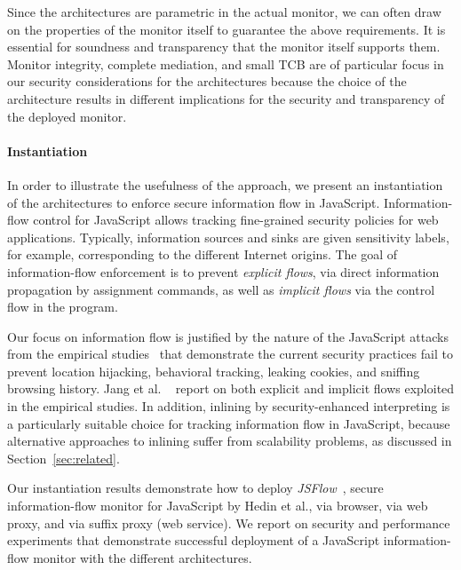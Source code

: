 \documentclass{llncs}
\begin{document}
Since the architectures are parametric in the actual monitor, we can
often draw on the properties of the monitor itself to guarantee the
above requirements. It is essential for soundness and
transparency that the monitor itself supports them. Monitor integrity,
complete mediation, and small TCB are of particular focus in our security
considerations for the architectures because the choice of the architecture results in
different implications for the security and transparency of the
deployed monitor.

\paragraph{Instantiation}
In order to illustrate the usefulness of the approach, we present an
instantiation of the architectures to enforce secure information flow
in JavaScript. Information-flow control for JavaScript allows tracking
fine-grained security policies for web applications. Typically,
information sources  and sinks are given sensitivity labels, for
example, corresponding to the different Internet origins. The goal of
information-flow enforcement is to prevent \emph{explicit flows}, via
direct information propagation by assignment commands, as well as
\emph{implicit flows} via the control flow in the program.

Our focus on information flow is justified by
the nature of the JavaScript attacks from the empirical
studies~\cite{Jang+:CCS10,Nikiforakis+:CCS12} that demonstrate the current security
practices fail to  prevent 
location
hijacking, behavioral tracking, leaking cookies, and sniffing browsing
history. Jang et al. ~\cite{Jang+:CCS10} report on both explicit and
implicit flows exploited in the empirical studies.
%
In addition, inlining by security-enhanced interpreting is a
particularly suitable choice for tracking information flow in
JavaScript, because alternative approaches to inlining suffer from
scalability problems, as discussed in Section~\ref{sec:related}. 

Our instantiation results demonstrate how to deploy
\emph{JSFlow}~\cite{Hedin:Sabelfeld:CSF12,JSFlow}, secure information-flow
monitor for JavaScript by Hedin et al., via
browser, via web proxy, and via suffix proxy (web service).
%
We report on security and performance experiments that demonstrate successful deployment of a JavaScript
information-flow monitor with the different architectures.


\end{document}
